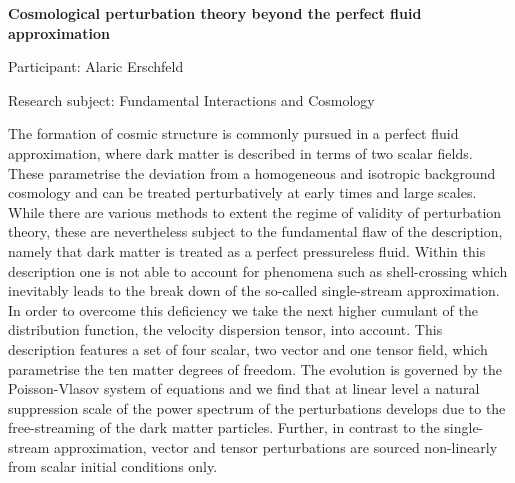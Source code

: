 \begin{minipage}[t]{1.0\textwidth}

\begin{center}

{{\large\bfseries Cosmological perturbation theory beyond the perfect fluid approximation}\par}

\end{center}

{\noindent Participant: Alaric Erschfeld\par} 

{\noindent Research subject: Fundamental Interactions and Cosmology\par}\medskip

\noindent The formation of cosmic structure is commonly pursued in a perfect fluid approximation, where dark matter is described in terms of two scalar fields. These parametrise the deviation from a homogeneous and isotropic background cosmology and can be treated perturbatively at early times and large scales. While there are various methods to extent the regime of validity of perturbation theory, these are nevertheless subject to the fundamental flaw of the description, namely that dark matter is treated as a perfect pressureless fluid. Within this description one is not able to account for phenomena such as shell-crossing which inevitably leads to the break down of the so-called single-stream approximation. In order to overcome this deficiency we take the next higher cumulant of the distribution function, the velocity dispersion tensor, into account. This description features a set of four scalar, two vector and one tensor field, which parametrise the ten matter degrees of freedom. The evolution is governed by the Poisson-Vlasov system of equations and we find that at linear level a natural suppression scale of the power spectrum of the perturbations develops due to the free-streaming of the dark matter particles. Further, in contrast to the single-stream approximation, vector and tensor perturbations are sourced non-linearly from scalar initial conditions only.\par\end{minipage}

\hfill 

